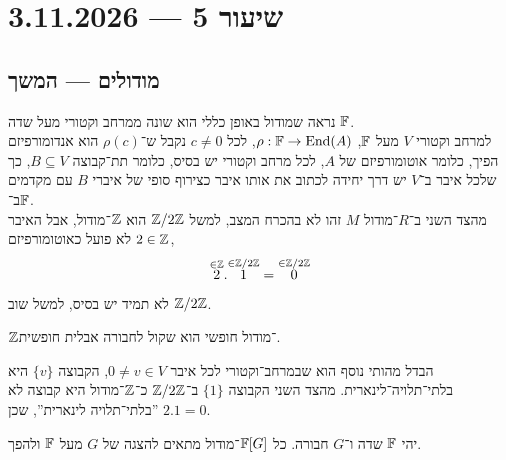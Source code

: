 \section{שיעור 5 --- 3.11.2026}
\subsection{מודולים --- המשך}
נראה שמודול באופן כללי הוא שונה ממרחב וקטורי מעל שדה $\mathbb{F}$. \\
למרחב וקטורי $V$ מעל $\mathbb{F}$, $\rho : \mathbb{F} \to \operatorname{End}(A)$, לכל $c \ne 0$ נקבל ש־$\rho(c)$ הוא אנדומורפיזם הפיך, כלומר אוטומורפיזם של $A$, לכל מרחב וקטורי יש בסיס, כלומר תת־קבוצה $B \subseteq V$,
כך שלכל איבר ב־$V$ יש דרך יחידה לכתוב את אותו איבר כצירוף סופי של איברי $B$ עם מקדמים ב־$\mathbb{F}$. \\
מהצד השני ב־$R$־מודול $M$ זהו לא בהכרח המצב, למשל $\mathbb{Z} / 2 \mathbb{Z}$ הוא $\mathbb{Z}$־מודול, אבל האיבר $2 \in \mathbb{Z}$ לא פועל כאוטומורפיזם,
\[
	\overset{\in \mathbb{Z}}{2} . \overset{\in \mathbb{Z} / 2 \mathbb{Z}}{1}
	= \overset{\in \mathbb{Z} / 2 \mathbb{Z}}{0}
\]
לא תמיד יש בסיס, למשל שוב $\mathbb{Z} / 2 \mathbb{Z}$.
\begin{example}
	$\mathbb{Z}$־מודול חופשי הוא שקול לחבורה אבלית חופשית.
\end{example}
הבדל מהותי נוסף הוא שבמרחב־וקטורי לכל איבר $0 \ne v \in V$, הקבוצה $\{ v \}$ היא בלתי־תלויה־לינארית.
מהצד השני הקבוצה $\{ 1 \}$ ב־$\mathbb{Z} / 2 \mathbb{Z}$ כ־$\mathbb{Z}$־מודול היא קבוצה לא ''בלתי־תלויה לינארית'', שכן $2 . 1 = 0$.
\begin{proposition}
	יהי $\mathbb{F}$ שדה ו־$G$ חבורה.
	כל $\mathbb{F}[G]$־מודול מתאים להצגה של $G$ מעל $\mathbb{F}$ ולהפך.
\end{proposition}
